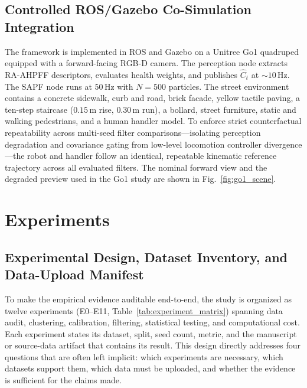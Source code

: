 \documentclass[11pt, a4paper]{article}
\begin{document}
\subsection{Controlled ROS/Gazebo Co-Simulation Integration}
\label{subsec:ros_setup}
The framework is implemented in ROS \cite{quigley2009ros} and Gazebo \cite{koenig2004design} on a Unitree Go1 quadruped equipped with a forward-facing RGB-D camera. The perception node extracts RA-AHPFF descriptors, evaluates health weights, and publishes $\hat{C}_t$ at $\sim 10\,\text{Hz}$. The SAPF node runs at $50\,\text{Hz}$ with $N=500$ particles. The street environment contains a concrete sidewalk, curb and road, brick facade, yellow tactile paving, a ten-step staircase ($0.15\,\text{m}$ rise, $0.30\,\text{m}$ run), a bollard, street furniture, static and walking pedestrians, and a human handler model. To enforce strict counterfactual repeatability across multi-seed filter comparisons—isolating perception degradation and covariance gating from low-level locomotion controller divergence—the robot and handler follow an identical, repeatable kinematic reference trajectory across all evaluated filters. The nominal forward view and the degraded preview used in the Go1 study are shown in Fig.~\ref{fig:go1_scene}.

\section{Experiments}
\label{sec:experiments}

\subsection{Experimental Design, Dataset Inventory, and Data-Upload Manifest}
\label{subsec:design}
To make the empirical evidence auditable end-to-end, the study is organized as twelve experiments (E0--E11, Table~\ref{tab:experiment_matrix}) spanning data audit, clustering, calibration, filtering, statistical testing, and computational cost. Each experiment states its dataset, split, seed count, metric, and the manuscript or source-data artifact that contains its result. This design directly addresses four questions that are often left implicit: which experiments are necessary, which datasets support them, which data must be uploaded, and whether the evidence is sufficient for the claims made.
\end{document}
